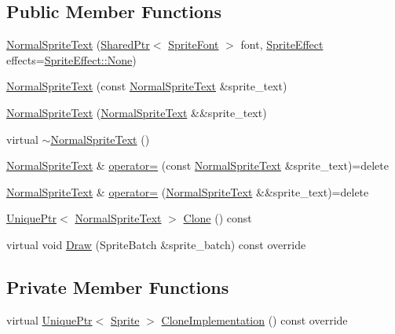 \subsection*{Public Member Functions}
\begin{DoxyCompactItemize}
\item 
\hyperlink{classmage_1_1_normal_sprite_text_a3943f079a5d18e27a2eca8c96fbfeb68}{Normal\+Sprite\+Text} (\hyperlink{namespacemage_a1e01ae66713838a7a67d30e44c67703e}{Shared\+Ptr}$<$ \hyperlink{classmage_1_1_sprite_font}{Sprite\+Font} $>$ font, \hyperlink{namespacemage_a9cfe18123066ba4236f548f9de75d881}{Sprite\+Effect} effects=\hyperlink{namespacemage_a9cfe18123066ba4236f548f9de75d881a6adf97f83acf6453d4a6a4b1070f3754}{Sprite\+Effect\+::\+None})
\item 
\hyperlink{classmage_1_1_normal_sprite_text_aa73a83a29b28d7b5f20240f3074e5d4d}{Normal\+Sprite\+Text} (const \hyperlink{classmage_1_1_normal_sprite_text}{Normal\+Sprite\+Text} \&sprite\+\_\+text)
\item 
\hyperlink{classmage_1_1_normal_sprite_text_ab2b8232a1bb1aa5294eaa335cb0ccd97}{Normal\+Sprite\+Text} (\hyperlink{classmage_1_1_normal_sprite_text}{Normal\+Sprite\+Text} \&\&sprite\+\_\+text)
\item 
virtual \hyperlink{classmage_1_1_normal_sprite_text_ae8575ab8ece5b8b923509fc7ab4d3dea}{$\sim$\+Normal\+Sprite\+Text} ()
\item 
\hyperlink{classmage_1_1_normal_sprite_text}{Normal\+Sprite\+Text} \& \hyperlink{classmage_1_1_normal_sprite_text_ab7dbd2e71dcaef5d6b7b767afa8d7094}{operator=} (const \hyperlink{classmage_1_1_normal_sprite_text}{Normal\+Sprite\+Text} \&sprite\+\_\+text)=delete
\item 
\hyperlink{classmage_1_1_normal_sprite_text}{Normal\+Sprite\+Text} \& \hyperlink{classmage_1_1_normal_sprite_text_a54cb023fad3b66dba35854ceaa50bc44}{operator=} (\hyperlink{classmage_1_1_normal_sprite_text}{Normal\+Sprite\+Text} \&\&sprite\+\_\+text)=delete
\item 
\hyperlink{namespacemage_a3316d7143a973e37adf1110f2e80ca31}{Unique\+Ptr}$<$ \hyperlink{classmage_1_1_normal_sprite_text}{Normal\+Sprite\+Text} $>$ \hyperlink{classmage_1_1_normal_sprite_text_a8357ea517cff639204da4825024d9d34}{Clone} () const
\item 
virtual void \hyperlink{classmage_1_1_normal_sprite_text_ad2a1b02bea18afd6bf61b106a727a355}{Draw} (Sprite\+Batch \&sprite\+\_\+batch) const override
\end{DoxyCompactItemize}
\subsection*{Private Member Functions}
\begin{DoxyCompactItemize}
\item 
virtual \hyperlink{namespacemage_a3316d7143a973e37adf1110f2e80ca31}{Unique\+Ptr}$<$ \hyperlink{classmage_1_1_sprite}{Sprite} $>$ \hyperlink{classmage_1_1_normal_sprite_text_acab5b61f8be4a475cd54b51278956e37}{Clone\+Implementation} () const override
\end{DoxyCompactItemize}

